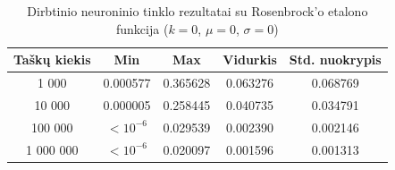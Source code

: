 \begin{table}[H]
    \centering
    \begin{tabular}{|c|c|c|c|c|}
        \hline
        \textbf{Taškų kiekis} & \textbf{Min} & \textbf{Max} & \textbf{Vidurkis} & \textbf{Std. nuokrypis} \\ \hline
        1 000        & 0.000577 & 0.365628 & 0.063276 & 0.068769 \\ \hline
        10 000       & 0.000005 & 0.258445 & 0.040735 & 0.034791 \\ \hline
        100 000      & $<10^{-6}$ & 0.029539 & 0.002390 & 0.002146 \\ \hline
        1 000 000    & $<10^{-6}$ & 0.020097 & 0.001596 & 0.001313 \\ \hline
    \end{tabular}
    \caption{Dirbtinio neuroninio tinklo rezultatai su Rosenbrock'o etalono funkcija ($k = 0$, $\mu = 0$, $\sigma = 0$)}
\end{table}
